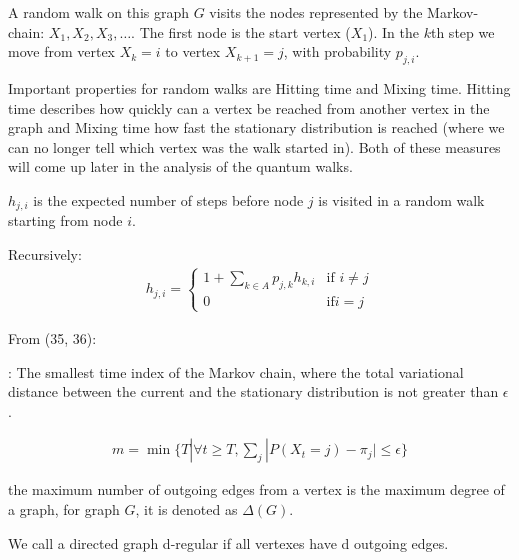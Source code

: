 A random walk on this graph $G$ visits the nodes represented by the Markov-chain: $X_1, X_2, X_3, \dots$. The first node is the start vertex ($X_1$). In the $k$th step we move from vertex $X_k=i$ to vertex $X_{k+1}=j$, with probability $p_{j,i}$.

Important properties for random walks are Hitting time and Mixing time. Hitting time describes how quickly can a vertex be reached from another vertex in the graph and Mixing time how fast the stationary distribution is reached (where we can no longer tell which vertex was the walk started in). Both of these measures will come up later in the analysis of the quantum walks.

 $h_{j,i}$ is the expected number of steps before node $j$ is visited in a random walk starting from node $i$.

Recursively:
\begin{align}
    h_{j,i} = \left\{
        \begin{array}{lr}
            1 + \sum\limits_{k\in{}A}p_{j,k}h_{k,i} & \text{if } i\neq{}j\\
            0 & \text{if} i=j
        \end{array}
    \right.
\end{align}

From \cite{KempeIntroduction} (35, 36):

: The smallest time index of the Markov chain, where the total variational distance between the current and the stationary distribution is not greater than $\epsilon$.

\begin{align}
m = \min\{T | \forall{}t\geq{}T, \sum\limits_{j}|P(X_t = j) - \pi_j| \leq \epsilon\}
\end{align}


 the maximum number of outgoing edges from a vertex is the maximum degree of a graph, for graph $G$, it is denoted as $\Delta(G)$.

 We call a directed graph d-regular if all vertexes have d outgoing edges.